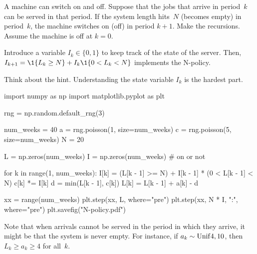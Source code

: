 \documentclass[stochastic-or.tex]{subfiles}
\begin{document}


\begin{exercise}\label{ex:n-policies}
A machine  can switch on and off. Suppose that the jobs that arrive in period~$k$ can be served in that period.
 If the system length hits~$N$ (becomes empty) in period~$k$, the machine switches on (off) in period $k+1$.
Make the recursions.
Assume the machine is  off at $k=0$.
\begin{hint}
  Introduce a variable $I_k\in\{0, 1\}$ to keep track of the state of the server.
  Then, $I_{k+1} = \1{\L_k\geq N} + I_k \1{0<\L_k<N}$ implements the N-policy.
\end{hint}
\begin{solution}
Think about the hint. Understanding the state variable $I_{k}$ is the hardest part.
\begin{python}
import numpy as np
import matplotlib.pyplot as plt


rng = np.random.default_rng(3)

num_weeks = 40
a = rng.poisson(1, size=num_weeks)
c = rng.poisson(5, size=num_weeks)
N = 20

L = np.zeros(num_weeks)
I = np.zeros(num_weeks)  # on or not

for k in range(1, num_weeks):
    I[k] = (L[k - 1] >= N) + I[k - 1] * (0 < L[k - 1] < N)
    c[k] *= I[k]
    d = min(L[k - 1], c[k])
    L[k] = L[k - 1] + a[k] - d


xx = range(num_weeks)
plt.step(xx, L, where="pre")
plt.step(xx, N * I, ":", where="pre")
plt.savefig("N-policy.pdf")
\end{python}
Note that when arrivals cannot be served in the period in which they arrive, it might be that the system is never empty.
For instance, if $a_{k}\sim\mathrm{Unif}4, 10$, then $L_{k}\geq a_{k} \geq 4$ for all~$k$.
\end{solution}
\end{exercise}
\end{document}
